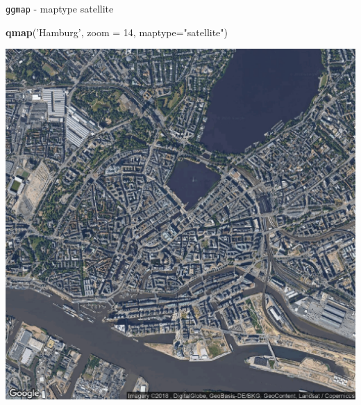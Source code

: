 \documentclass[ignorenonframetext,]{beamer}
\newenvironment{Shaded}{\begin{snugshade}}{\end{snugshade}}
\newcommand{\DataTypeTok}[1]{\textcolor[rgb]{0.13,0.29,0.53}{#1}}
\newcommand{\DecValTok}[1]{\textcolor[rgb]{0.00,0.00,0.81}{#1}}
\newcommand{\KeywordTok}[1]{\textcolor[rgb]{0.13,0.29,0.53}{\textbf{#1}}}
\newcommand{\NormalTok}[1]{#1}
\newcommand{\StringTok}[1]{\textcolor[rgb]{0.31,0.60,0.02}{#1}}
\begin{document}
\begin{frame}[fragile]{\texttt{ggmap} - maptype satellite}
\protect\hypertarget{ggmap---maptype-satellite}{}

\begin{Shaded}
\begin{Highlighting}[]
\KeywordTok{qmap}\NormalTok{(}\StringTok{'Hamburg'}\NormalTok{, }\DataTypeTok{zoom =} \DecValTok{14}\NormalTok{, }\DataTypeTok{maptype=}\StringTok{"satellite"}\NormalTok{)}
\end{Highlighting}
\end{Shaded}

\includegraphics{figure/ham_map_sat.pdf}

\end{frame}
\end{document}
